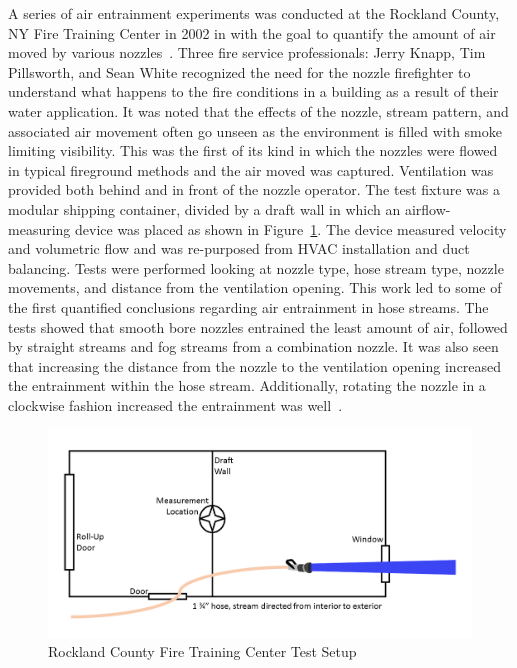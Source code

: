 \documentclass[12pt,oneside]{book}
\begin{document}
A series of air entrainment experiments was conducted at the Rockland County, NY Fire Training Center in 2002 in with the goal to quantify the amount of air moved by various nozzles~\cite{KnappNozzles1}. Three fire service professionals: Jerry Knapp, Tim Pillsworth, and Sean White recognized the need for the nozzle firefighter to understand what happens to the fire conditions in a building as a result of their water application. It was noted that the effects of the nozzle, stream pattern, and associated air movement often go unseen as the environment is filled with smoke limiting visibility. This was the first of its kind in which the nozzles were flowed in typical fireground methods and the air moved was captured. Ventilation was provided both behind and in front of the nozzle operator. The test fixture was a modular shipping container, divided by a draft wall in which an airflow-measuring device was placed as shown in Figure~\ref{fig:Rockland_County_Test_Setup}. The device measured velocity and volumetric flow and was re-purposed from HVAC installation and duct balancing. Tests were performed looking at nozzle type, hose stream type, nozzle movements, and distance from the ventilation opening. This work led to some of the first quantified conclusions regarding air entrainment in hose streams. The tests showed that smooth bore nozzles entrained the least amount of air, followed by straight streams and fog streams from a combination nozzle. It was also seen that increasing the distance from the nozzle to the ventilation opening increased the entrainment within the hose stream. Additionally, rotating the nozzle in a clockwise fashion increased the entrainment was well~\cite{KnappNozzles1,KnappNozzles2,KnappNozzles3}.

\begin{figure}[!ht]
	\centering
	\includegraphics[width=\columnwidth]{Figures/Air_Entrainment/Knapp_Layout.png}
	\caption{Rockland County Fire Training Center Test Setup}
	\label{fig:Rockland_County_Test_Setup}
\end{figure}
\end{document}
